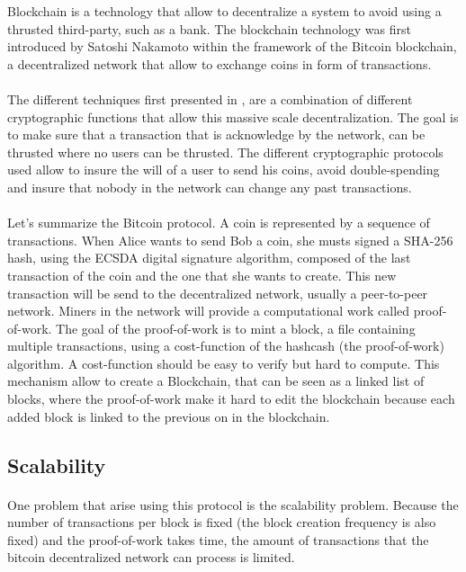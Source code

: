 \documentclass[11pt,a4paper]{article}
\begin{document}
Blockchain is a technology that allow to decentralize a
system to avoid using a thrusted third-party, such as a bank.
The blockchain technology was first introduced by
Satoshi Nakamoto \cite{bitcoin} within the framework
of the Bitcoin blockchain, a decentralized network
that allow to exchange coins in form of transactions.

\paragraph{}

The different techniques first presented in \cite{bitcoin}, are
a combination of different cryptographic functions that allow
this massive scale decentralization. The goal is to make
sure that a transaction that is acknowledge by the network,
can be thrusted where no users can be thrusted.
The different cryptographic protocols used allow to insure
the will of a user to send his coins, avoid double-spending and
insure that nobody in the network can change any past transactions.


\paragraph{}

Let's summarize the Bitcoin protocol. A coin is represented by
a sequence of transactions. When Alice wants to send Bob a coin,
she musts signed a SHA-256 hash, using the ECSDA digital signature
algorithm, composed of the last transaction of the coin
and the one that she wants to create. This new transaction
will be send to the decentralized network,
usually a peer-to-peer network. Miners in the network
will provide a computational work called proof-of-work.
The goal of the proof-of-work is to mint a block, a
file containing multiple transactions, using a cost-function
of the hashcash \cite{hashcash} (the proof-of-work) algorithm.
A cost-function should be easy to verify but hard to compute.
This mechanism allow to create a Blockchain, that can be seen
as a linked list of blocks, where the proof-of-work make it
hard to edit the blockchain because each added block
is linked to the previous on in the blockchain.

\subsection{Scalability}

\paragraph{}
One problem that arise using this protocol is the scalability problem.
Because the number of transactions per block is fixed
(the block creation frequency is also fixed)
and the
proof-of-work takes time, the amount of transactions
that the bitcoin decentralized network can process is limited.
\end{document}
